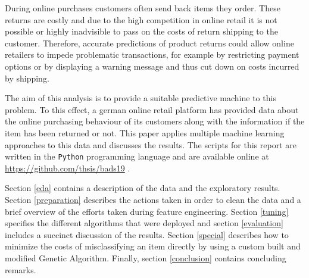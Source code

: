 During online purchases customers often send back items they order. These returns are costly and due to the high competition in online retail it is not possible or highly inadvisible to pass on the costs of return shipping to the customer. Therefore, accurate predictions of product returns could allow online retailers to impede problematic transactions, for example by restricting payment options or by displaying a warning message and thus cut down on costs incurred by shipping. 

The aim of this analysis is to provide a suitable predictive machine to this problem. To this effect, a german online retail platform has provided data about the online purchasing behaviour of its customers along with the information if the item has been returned or not. This paper applies multiple machine learning approaches to this data and discusses the results. The scripts for this report are written in the \texttt{Python} programming language and are available online at \href{https://github.com/thsis/bads19}{https://github.com/thsis/bads19} \cite{python, scipy, pyplot, seaborn}.

Section \ref{eda} contains a description of the data and the exploratory results. Section \ref{preparation} describes the actions taken in order to clean the data and a brief overview of the efforts taken during feature engineering. Section \ref{tuning} specifies the different algorithms that were deployed and section \ref{evaluation} includes a succinct discussion of the results. Section \ref{special} describes how to minimize the costs of misclassifying an item directly by using a custom built and modified Genetic Algorithm. Finally, section \ref{conclusion} contains concluding remarks. 